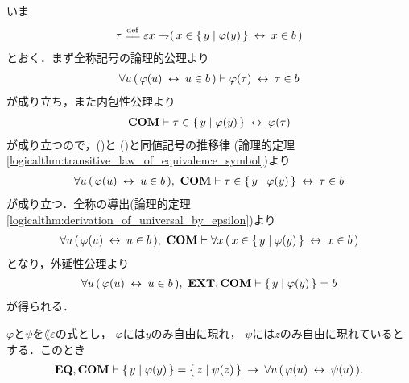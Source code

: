 	\begin{sketch}
		いま
		\begin{align}
			\tau \defeq 
			\varepsilon x \negation (\, x \in \Set{y}{\varphi(y)} \lrarrow x \in b\, )
		\end{align}
		とおく．まず全称記号の論理的公理より
		\begin{align}
			\forall u\, (\, \varphi(u) \hspace{0.25em}\leftrightarrow\hspace{0.25em} u \in b\, )
			\vdash \varphi(\tau) \hspace{0.25em}\leftrightarrow\hspace{0.25em} \tau \in b
			\label{fom:equivalent_formula_rewriting_4_1}
		\end{align}
		が成り立ち，また内包性公理より
		\begin{align}
			\mbox{\bf COM} \vdash \tau \in \{\, y \mid \varphi(y)\, \} \hspace{0.25em}\leftrightarrow\hspace{0.25em} \varphi(\tau)
			\label{fom:equivalent_formula_rewriting_4_2}
		\end{align}
		が成り立つので，()と
		()と同値記号の推移律
		(論理的定理\ref{logicalthm:transitive_law_of_equivalence_symbol})より
		\begin{align}
			\forall u\, (\, \varphi(u) \hspace{0.25em}\leftrightarrow\hspace{0.25em} u \in b\, ),\ \mbox{\bf COM} \vdash
			\tau \in \{\, y \mid \varphi(y)\, \} \hspace{0.25em}\leftrightarrow\hspace{0.25em} \tau \in b
		\end{align}
		が成り立つ．全称の導出(論理的定理\ref{logicalthm:derivation_of_universal_by_epsilon})より
		\begin{align}
			\forall u\, (\, \varphi(u) \hspace{0.25em}\leftrightarrow\hspace{0.25em} u \in b\, ),\ \mbox{\bf COM} \vdash
			\forall x\, (\, x \in \{\, y \mid \varphi(y)\, \} \hspace{0.25em}\leftrightarrow\hspace{0.25em} x \in b\, )
		\end{align}
		となり，外延性公理より
		\begin{align}
			\forall u\, (\, \varphi(u) \lrarrow u \in b\, ),\ \EXTAX,\COMAX \vdash
			\Set{y}{\varphi(y)} = b
		\end{align}
		が得られる．
		\QED
	\end{sketch}
	
	\begin{screen}
		\begin{thm}
		\label{thm:equivalent_formula_rewriting_5}
			$\varphi$と$\psi$を$\lang{\varepsilon}$の式とし，
			$\varphi$には$y$のみ自由に現れ，
			$\psi$には$z$のみ自由に現れているとする．このとき
			\begin{align}
				\mbox{{\bf EQ}},\mbox{\bf COM} \vdash \{\, y \mid \varphi(y)\, \} = \{\, z \mid \psi(z)\, \}
				\hspace{0.25em}\rightarrow\hspace{0.25em} \forall u\, (\, \varphi(u) \hspace{0.25em}\leftrightarrow\hspace{0.25em} \psi(u)\, ).
			\end{align}
		\end{thm}
	\end{screen}
	
